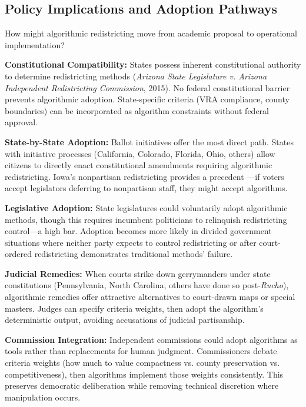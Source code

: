 \subsection{Policy Implications and Adoption Pathways}

How might algorithmic redistricting move from academic proposal to operational implementation?

\textbf{Constitutional Compatibility:} States possess inherent constitutional authority to determine redistricting methods (\textit{Arizona State Legislature v. Arizona Independent Redistricting Commission}, 2015). No federal constitutional barrier prevents algorithmic adoption. State-specific criteria (VRA compliance, county boundaries) can be incorporated as algorithm constraints without federal approval.

\textbf{State-by-State Adoption:} Ballot initiatives offer the most direct path. States with initiative processes (California, Colorado, Florida, Ohio, others) allow citizens to directly enact constitutional amendments requiring algorithmic redistricting. Iowa's nonpartisan redistricting provides a precedent \cite{deford2019implementing}—if voters accept legislators deferring to nonpartisan staff, they might accept algorithms.

\textbf{Legislative Adoption:} State legislatures could voluntarily adopt algorithmic methods, though this requires incumbent politicians to relinquish redistricting control—a high bar. Adoption becomes more likely in divided government situations where neither party expects to control redistricting or after court-ordered redistricting demonstrates traditional methods' failure.

\textbf{Judicial Remedies:} When courts strike down gerrymanders under state constitutions (Pennsylvania, North Carolina, others have done so post-\textit{Rucho}), algorithmic remedies offer attractive alternatives to court-drawn maps or special masters. Judges can specify criteria weights, then adopt the algorithm's deterministic output, avoiding accusations of judicial partisanship.

\textbf{Commission Integration:} Independent commissions could adopt algorithms as tools rather than replacements for human judgment. Commissioners debate criteria weights (how much to value compactness vs. county preservation vs. competitiveness), then algorithms implement those weights consistently. This preserves democratic deliberation while removing technical discretion where manipulation occurs.

